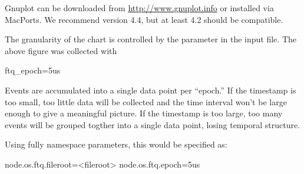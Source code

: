 Gnuplot can be downloaded from \url{http://www.gnuplot.info} or installed via MacPorts.
We recommend version 4.4, but at least 4.2 should be compatible.

The granularity of the chart is controlled by the  parameter in the input file. 
The above figure was collected with

\begin{ViFile}
ftq_epoch=5us
\end{ViFile}
Events are accumulated into a single data point per ``epoch.''
If the timestamp is too small, too little data will be collected and the time interval won't be large enough to give a meaningful picture.
If the timestamp is too large, too many events will be grouped togther into a single data point, losing temporal structure.

Using fully namespace parameters, this would be specified as:


\begin{ViFile}
node.os.ftq.fileroot=<fileroot>
node.os.ftq.epoch=5us
\end{ViFile}
